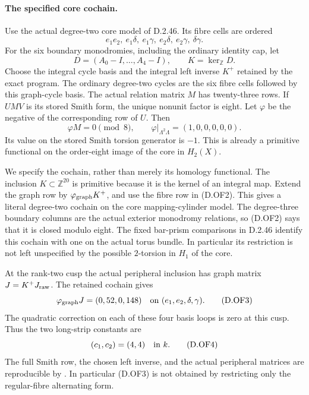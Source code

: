 \paragraph{The specified core cochain.}
Use the actual degree-two core model of D.2.46. Its fibre cells are
ordered
\[
 e_1e_2,\ e_1\delta,\ e_1\gamma,\ e_2\delta,\
                                      e_2\gamma,\ \delta\gamma.
\]
For the six boundary monodromies, including the ordinary identity cap,
let
\[
 D=(A_0-I,\ldots,A_4-I),\qquad K=\ker_{\mathbb Z}D.
\]
Choose the integral cycle basis and the integral left inverse \(K^+\)
retained by the exact program. The ordinary degree-two cycles are the
six fibre cells followed by this graph-cycle basis. The actual
relation matrix \(M\) has twenty-three rows. If
\(UMV\) is its stored Smith form, the unique nonunit factor is eight.
Let \(\varphi\) be the negative of the corresponding row of \(U\).
Then
\[
 \varphi M=0\pmod8,\qquad
 \varphi|_{\Lambda^2\Lambda}=(1,0,0,0,0,0).                \tag{D.OF2}
\]
Its value on the stored Smith torsion generator is \(-1\).
This is already a primitive functional on the order-eight image of
the core in \(H_2(X)\).

We specify the cochain, rather than merely its homology functional.
The inclusion \(K\subset\mathbb Z^{20}\) is primitive because it is
the kernel of an integral map. Extend the graph row by
\(\varphi_{\rm graph}K^+\), and use the fibre row in (D.OF2).
This gives a literal degree-two cochain on the core mapping-cylinder
model. The degree-three boundary columns are the actual exterior
monodromy relations, so (D.OF2) says that it is closed modulo eight.
The fixed bar-prism comparisons in D.2.46 identify this cochain with
one on the actual torus bundle. In particular its restriction is not
left unspecified by the possible \(2\)-torsion in \(H_1\) of the core.

At the rank-two cusp the actual peripheral inclusion has graph
matrix \(J=K^+J_{\rm raw}\). The retained cochain gives
\[
 \varphi_{\rm graph}J=(0,52,0,148)
       \quad\hbox{on }(e_1,e_2,\delta,\gamma).             \tag{D.OF3}
\]
The quadratic correction on each of these four basis loops is zero
at this cusp. Thus the two long-strip constants are
\[
                      (c_1,c_2)=(4,4)\quad\hbox{in }k.   \tag{D.OF4}
\]
The full Smith row, the chosen left inverse, and the actual
peripheral matrices are reproducible by
. In particular (D.OF3) is not
obtained by restricting only the regular-fibre alternating form.

